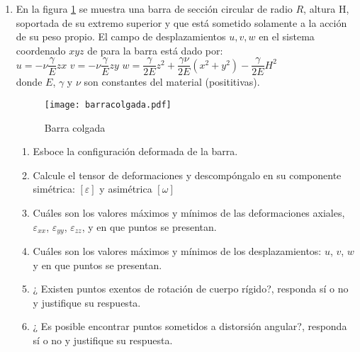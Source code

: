 \documentclass[../notas medios.tex]{subfiles}
\begin{document}
\begin{enumerate}
Se pide determinar lo siguiente:
	
\begin{enumerate}
	\item Calcular los desplazamientos de los puntos $A$, $B$ y $C$ para cada uno de los estados de deformaci\'on y dibujar las configuraciones deformadas.
	\item Si se sabe que las dimensiones del rect\'angulo $b=1.00$ y $h=1.00$ y los valores de las transformaciones son $d=0.01$, $e=0.005$ y $f=0.0025$. Calcular las direcciones principales y los valores propios para la superposici\'on lineal de las deformaciones. 	
\end{enumerate}

\newpage
\item  \label{punto04_d} En la figura \cref{BarraColgada} se muestra una barra de sección circular de radio $R$, altura H, soportada de su extremo superior y que está sometido solamente a la acción de su peso propio. El campo de desplazamientos $u,v,w$ en el sistema coordenado $xyz$ de para la barra está dado por: \\

	$u= -\nu \dfrac{\gamma}{E} z x $ \hspace{1cm}	
	$v= -\nu \dfrac{\gamma}{E} z y $ \hspace{1cm}	
	$w= \dfrac{\gamma}{2E} z^2 +\dfrac{\gamma \nu}{2E} (x^2+y^2)-\dfrac{\gamma}{2E} H^2  $ \\
	
donde $E$, $\gamma$ y $\nu$ son constantes del material (posititivas). 
	
\begin{figure}[H]
	\centering
	\texttt{[image: barracolgada.pdf]} \label{figure1}
	\caption{Barra colgada}
	\label{BarraColgada}
\end{figure}
%
\begin{enumerate}
% 
	\item Esboce la configuraci\'on deformada de la barra.	
	\item Calcule el tensor de deformaciones y descompóngalo en su componente simétrica: $[\varepsilon]$ y asimétrica  $[\omega]$
	\item Cuáles son los valores máximos y mínimos de las deformaciones axiales, $\varepsilon_{xx}$, $\varepsilon_{yy}$, $\varepsilon_{zz}$, y en que puntos se presentan.
	\item Cuáles son los valores máximos y mínimos de los desplazamientos: $u$, $v$, $w$ y en que puntos se presentan.
	\item ¿ Existen puntos exentos de rotaci\'on de cuerpo r\'igido?, responda s\'i o no y justifique su respuesta.	
	\item ¿ Es posible encontrar puntos sometidos a distorsi\'on angular?, responda s\'i o no y justifique su respuesta.
%
\end{enumerate}
%
\newpage


\end{enumerate}
\end{document}
